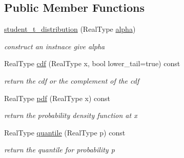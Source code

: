 \subsection*{Public Member Functions}
\begin{DoxyCompactItemize}
\item 
\mbox{\label{structstudent__t__distribution_a09042926811e047e71a2aefdfefc6ce3}} 
\mbox{\hyperlink{structstudent__t__distribution_a09042926811e047e71a2aefdfefc6ce3}{student\+\_\+t\+\_\+distribution}} (Real\+Type \mbox{\hyperlink{structstudent__t__distribution_af79519cdd38c501e1d67de31c93f3daf}{alpha}})
\begin{DoxyCompactList}\small\item\em construct an instnace give alpha \end{DoxyCompactList}\item 
\mbox{\label{structstudent__t__distribution_a233da5eb814ed07f779a5005478df253}} 
Real\+Type \mbox{\hyperlink{structstudent__t__distribution_a233da5eb814ed07f779a5005478df253}{cdf}} (Real\+Type x, bool lower\+\_\+tail=true) const
\begin{DoxyCompactList}\small\item\em return the cdf or the complement of the cdf \end{DoxyCompactList}\item 
\mbox{\label{structstudent__t__distribution_a811239357f8d470db5c4c45bf0ddf996}} 
Real\+Type \mbox{\hyperlink{structstudent__t__distribution_a811239357f8d470db5c4c45bf0ddf996}{pdf}} (Real\+Type x) const
\begin{DoxyCompactList}\small\item\em return the probability density function at x \end{DoxyCompactList}\item 
\mbox{\label{structstudent__t__distribution_abf87bfa9961e9ece0caa75fd545db2b2}} 
Real\+Type \mbox{\hyperlink{structstudent__t__distribution_abf87bfa9961e9ece0caa75fd545db2b2}{quantile}} (Real\+Type p) const
\begin{DoxyCompactList}\small\item\em return the quantile for probability p \end{DoxyCompactList}\item 

\end{DoxyCompactItemize}
